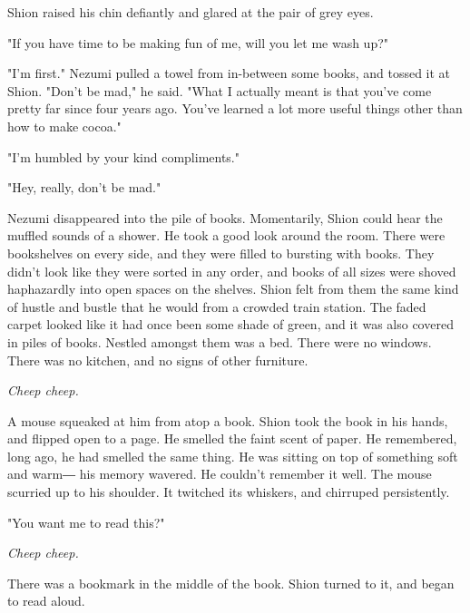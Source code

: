 Shion raised his chin defiantly and glared at the pair of grey eyes.

"If you have time to be making fun of me, will you let me wash up?"

"I'm first." Nezumi pulled a towel from in-between some books, and
tossed it at Shion. "Don't be mad," he said. "What I actually meant is
that you've come pretty far since four years ago. You've learned a lot
more useful things other than how to make cocoa."

"I'm humbled by your kind compliments."

"Hey, really, don't be mad."

Nezumi disappeared into the pile of books. Momentarily, Shion could hear
the muffled sounds of a shower. He took a good look around the room.
There were bookshelves on every side, and they were filled to bursting
with books. They didn't look like they were sorted in any order, and
books of all sizes were shoved haphazardly into open spaces on the
shelves. Shion felt from them the same kind of hustle and bustle that he
would from a crowded train station. The faded carpet looked like it had
once been some shade of green, and it was also covered in piles of
books. Nestled amongst them was a bed. There were no windows. There was
no kitchen, and no signs of other furniture.

\emph{Cheep cheep.}

A mouse squeaked at him from atop a book. Shion took the book in his
hands, and flipped open to a page. He smelled the faint scent of paper.
He remembered, long ago, he had smelled the same thing. He was sitting
on top of something soft and warm― his memory wavered. He couldn't
remember it well. The mouse scurried up to his shoulder. It twitched its
whiskers, and chirruped persistently.

"You want me to read this?"

\emph{Cheep cheep.}

There was a bookmark in the middle of the book. Shion turned to it, and
began to read aloud.


